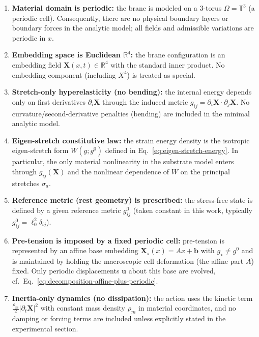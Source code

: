 \begin{enumerate}
  \item \textbf{Material domain is periodic:}
  the brane is modeled on a 3-torus $\Omega=\mathbb T^3$ (a periodic cell).
  Consequently, there are no physical boundary layers or boundary forces in the analytic model;
  all fields and admissible variations are periodic in $x$.

  \item \textbf{Embedding space is Euclidean $\mathbb R^4$:}
  the brane configuration is an embedding field $\mathbf X(x,t)\in\mathbb R^4$
  with the standard inner product. No embedding component (including $X^4$) is treated as special.

  \item \textbf{Stretch-only hyperelasticity (no bending):}
  the internal energy depends only on first derivatives $\partial_i\mathbf X$
  through the induced metric $g_{ij}=\partial_i\mathbf X\cdot\partial_j\mathbf X$.
  No curvature/second-derivative penalties (bending) are included in the minimal analytic model.

  \item \textbf{Eigen-stretch constitutive law:}
  the strain energy density is the isotropic eigen-stretch form
  $W(g;g^0)$ defined in Eq.~\eqref{eq:eigen-stretch-energy}.
  In particular, the only material nonlinearity in the substrate model enters through
  $g_{ij}(\mathbf X)$ and the nonlinear dependence of $W$ on the principal stretches $\sigma_a$.

  \item \textbf{Reference metric (rest geometry) is prescribed:}
  the stress-free state is defined by a given reference metric $g^0_{ij}$
  (taken constant in this work, typically $g^0_{ij}=\ell_0^2\delta_{ij}$).

  \item \textbf{Pre-tension is imposed by a fixed periodic cell:}
  pre-tension is represented by an affine base embedding $\mathbf X_\star(x)=Ax+\mathbf b$
  with $g_\star\neq g^0$ and is maintained by holding the macroscopic cell deformation (the affine part $A$) fixed.
  Only periodic displacements $\mathbf u$ about this base are evolved,
  cf.\ Eq.~\eqref{eq:decomposition-affine-plus-periodic}.

  \item \textbf{Inertia-only dynamics (no dissipation):}
  the action uses the kinetic term $\frac{\rho_m}{2}|\partial_t\mathbf X|^2$
  with constant mass density $\rho_m$ in material coordinates, and no damping or forcing terms
  are included unless explicitly stated in the experimental section.


\end{enumerate}
